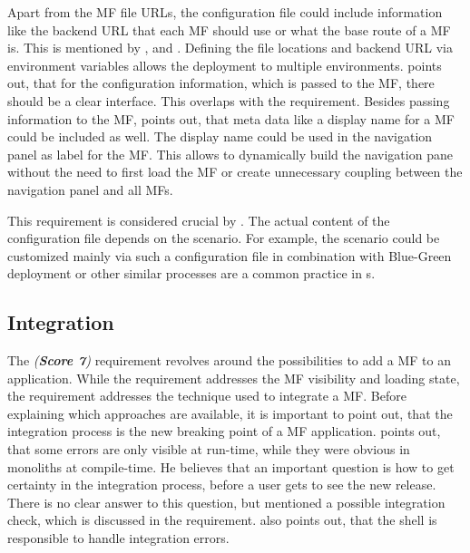 Apart from the \ac{MF} file \acp{URL}, the configuration file could include information like the backend \ac{URL} that each \ac{MF} should use or what the base route of a \ac{MF} is.
This is mentioned by \textciteRehm{}, \textciteOlleck{} and \textcite{Dornenburg.2019}.
Defining the file locations and backend \ac{URL} via environment variables allows the deployment to multiple environments.
\citeauthorOlleck{} points out, that for the configuration information, which is passed to the \ac{MF}, there should be a clear interface.
This overlaps with the \textit{} requirement.
Besides passing information to the \ac{MF}, \textcite{Grijzen.2019} points out, that meta data like a display name for a \ac{MF} could be included as well.
The display name could be used in the navigation panel as label for the \ac{MF}.
This allows to dynamically build the navigation pane without the need to first load the \ac{MF} or create unnecessary coupling between the navigation panel and all \acp{MF}.

This requirement is considered crucial by \textcite{Vogel.2020.Rehm}.
The actual content of the configuration file depends on the scenario.
For example, the scenario \textit{} could be customized mainly via such a configuration file in combination with Blue-Green deployment or other similar processes are a common practice in \textit{}s.





\subsection{Integration}\label{cha:requirement_detail_integration_integration}

The  \textit{ (\textbf{Score 7})} requirement revolves around the possibilities to add a \ac{MF} to an application.
While the \textit{} requirement addresses the \ac{MF} visibility and loading state, the \textit{} requirement addresses the technique used to integrate a \ac{MF}.
Before explaining which approaches are available, it is important to point out, that the integration process is the new breaking point of a \ac{MF} application.
\textciteOlleck{} points out, that some errors are only visible at run-time, while they were obvious in monoliths at compile-time.
He believes that an important question is how to get certainty in the integration process, before a user gets to see the new release.
There is no clear answer to this question, but \textcite{Laug.2018} mentioned a possible integration check, which is discussed in the \textit{} requirement.
\citeauthor{Laug.2018} also points out, that the shell is responsible to handle integration errors.

